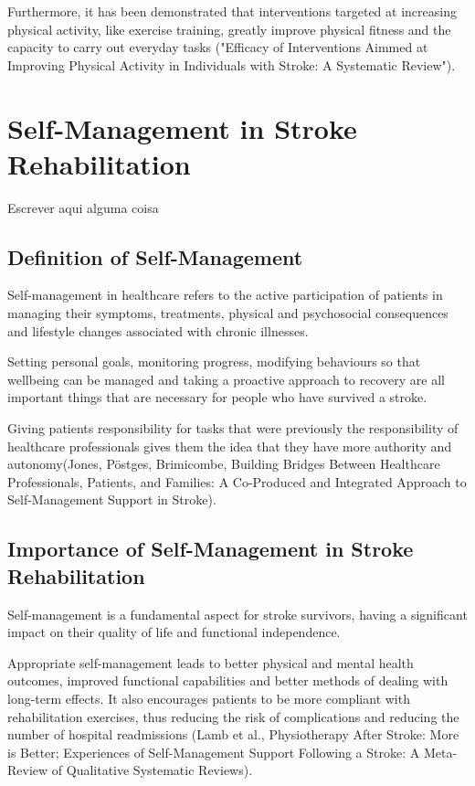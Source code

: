 Furthermore, it has been demonstrated that interventions targeted at increasing physical activity, like exercise training, greatly improve physical fitness and the capacity to carry out everyday tasks ("Efficacy of Interventions Aimmed at Improving Physical Activity in Individuals with Stroke: A Systematic Review").

\section{Self-Management in Stroke Rehabilitation}
\label{sec:selfmanagement}
Escrever aqui alguma coisa  

\subsection{Definition of Self-Management}
\label{sec:definitionofselfmanagement}
Self-management in healthcare refers to the active participation of patients in managing their symptoms, treatments, physical and psychosocial consequences and lifestyle changes associated with chronic illnesses. 


Setting personal goals, monitoring progress, modifying behaviours so that wellbeing can be managed and taking a proactive approach to recovery are all important things that are necessary for people who have survived a stroke. 


Giving patients responsibility for tasks that were previously the responsibility of healthcare professionals gives them the idea that they have more authority and autonomy(Jones, Pöstges,  Brimicombe, Building Bridges Between Healthcare Professionals, Patients, and Families: A Co-Produced and Integrated Approach to Self-Management Support in Stroke).

\subsection{Importance of Self-Management in Stroke Rehabilitation}
\label{sec:importanceofselfmanagement}
Self-management is a fundamental aspect for stroke survivors, having a significant impact on their quality of life and functional independence.


 Appropriate self-management leads to better physical and mental health outcomes, improved functional capabilities and better methods of dealing with long-term effects. It also encourages patients to be more compliant with rehabilitation exercises, thus reducing the risk of complications and reducing the number of hospital readmissions (Lamb et al., Physiotherapy After Stroke: More is Better; Experiences of Self-Management Support Following a Stroke: A Meta-Review of Qualitative Systematic Reviews). 


